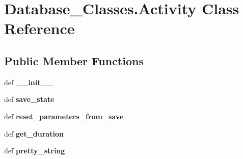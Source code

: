 \hypertarget{classDatabase__Classes_1_1Activity}{\section{Database\-\_\-\-Classes.\-Activity Class Reference}
\label{classDatabase__Classes_1_1Activity}
}
\subsection*{Public Member Functions}
\begin{DoxyCompactItemize}
\item 
\hypertarget{classDatabase__Classes_1_1Activity_a5017887db3b072677022ce35c3512a33}{def {\bfseries \-\_\-\-\_\-init\-\_\-\-\_\-}}\label{classDatabase__Classes_1_1Activity_a5017887db3b072677022ce35c3512a33}

\item 
\hypertarget{classDatabase__Classes_1_1Activity_a008a711f8035ce5790d9c85097c5748a}{def {\bfseries save\-\_\-state}}\label{classDatabase__Classes_1_1Activity_a008a711f8035ce5790d9c85097c5748a}

\item 
\hypertarget{classDatabase__Classes_1_1Activity_afecd5fb90df723c4b3f4b2ba7eee14cd}{def {\bfseries reset\-\_\-parameters\-\_\-from\-\_\-save}}\label{classDatabase__Classes_1_1Activity_afecd5fb90df723c4b3f4b2ba7eee14cd}

\item 
\hypertarget{classDatabase__Classes_1_1Activity_ae6ba07eeb9e023dc9109a18b1d58c0e9}{def {\bfseries get\-\_\-duration}}\label{classDatabase__Classes_1_1Activity_ae6ba07eeb9e023dc9109a18b1d58c0e9}

\item 
\hypertarget{classDatabase__Classes_1_1Activity_a803a0c548bb38dcfcd4af1dc399cc004}{def {\bfseries pretty\-\_\-string}}\label{classDatabase__Classes_1_1Activity_a803a0c548bb38dcfcd4af1dc399cc004}

\end{DoxyCompactItemize}
